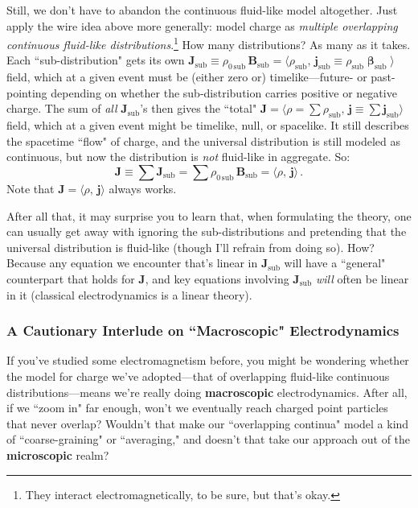 \documentclass[12pt]{article}
\renewcommand{\vv}[1]{\mathbf{#1}}
\newcommand{\vvbeta}{\bm{\upbeta}}
\begin{document}
Still, we don't have to abandon the continuous fluid-like model altogether. Just apply the wire idea above more generally: model charge as \emph{multiple overlapping continuous fluid-like distributions}.\footnote{They interact electromagnetically, to be sure, but that's okay.} How many distributions? As many as it takes. Each ``sub-distribution" gets its own ${\vv J_{\mathrm{sub}} \equiv \rho_{0 \, \mathrm{sub}} \, \vv B_{\mathrm{sub}} = \langle \rho_{\mathrm{sub}}, \, \vv j_{\mathrm{sub}} \equiv \rho_{\mathrm{sub}} \vvbeta_{\mathrm{sub}} \rangle}$ field, which at a given event must be (either zero or) timelike---future- or past-pointing depending on whether the sub-distribution carries positive or negative charge. The sum of \emph{all} $\vv J_{\mathrm{sub}}$'s then gives the ``total" ${\vv J = \langle \rho = \sum \rho_{\mathrm{sub}}, \, \vv j \equiv \sum \vv j_{\mathrm{sub}} \rangle }$ field, which at a given event might be timelike, null, or spacelike. It still describes the spacetime ``flow" of charge, and the universal distribution is still modeled as continuous, but now the distribution is \emph{not} fluid-like in aggregate. So:
\begin{equation}\label{eq:fc}
\boxed{ \vv J \equiv \sum \vv J_{\mathrm{sub}} = \sum \rho_{0 \, \mathrm{sub}} \, \vv B_{\mathrm{sub}} = \langle \rho, \, \vv j \rangle } \, .
\end{equation}
Note that $\vv J = \langle \rho, \, \vv j \rangle$ always works.

After all that, it may surprise you to learn that, when formulating the theory, one can usually get away with ignoring the sub-distributions and pretending that the universal distribution is fluid-like (though I'll refrain from doing so). How? Because any equation we encounter that's linear in $\vv J_{\mathrm{sub}}$ will have a ``general" counterpart that holds for $\vv J$, and key equations involving $\vv J_{\mathrm{sub}}$ \emph{will} often be linear in it (classical electrodynamics is a linear theory).


\subsubsection[A Cautionary Interlude on “Macroscopic” Electrodynamics]{A Cautionary Interlude on ``Macroscopic" Electrodynamics}

If you've studied some electromagnetism before, you might be wondering whether the model for charge we've adopted---that of overlapping fluid-like continuous distributions---means we’re really doing \textbf{macroscopic} electrodynamics. After all, if we ``zoom in" far enough, won't we eventually reach charged point particles that never overlap? Wouldn't that make our ``overlapping continua" model a kind of ``coarse-graining" or ``averaging," and doesn't that take our approach out of the \textbf{microscopic} realm?
\end{document}
